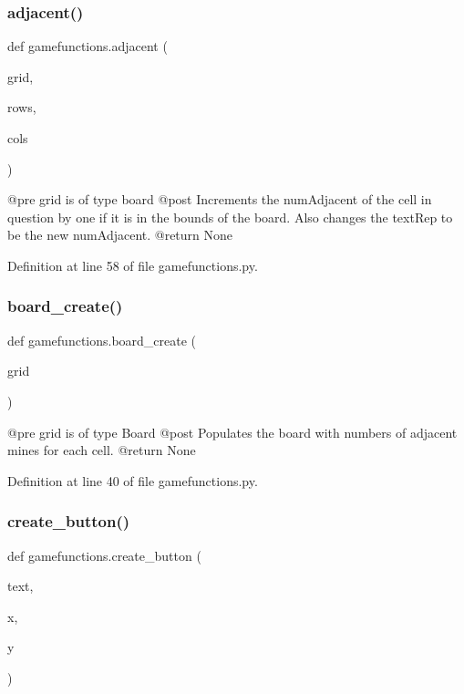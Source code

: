 \subsubsection{\texorpdfstring{adjacent()}{adjacent()}}
{\footnotesize\ttfamily def gamefunctions.\+adjacent (\begin{DoxyParamCaption}\item[{}]{grid,  }\item[{}]{rows,  }\item[{}]{cols }\end{DoxyParamCaption})}

\begin{DoxyVerb}@pre    grid is of type board
    @post   Increments the numAdjacent of the cell in question by one if it is in the bounds of the board. Also changes the textRep to be the new numAdjacent.
    @return None
\end{DoxyVerb}
 

Definition at line 58 of file gamefunctions.\+py.

\mbox{\label{namespacegamefunctions_a26a89961ef41d92fb61c4703f9c63dca}} 
\subsubsection{\texorpdfstring{board\+\_\+create()}{board\_create()}}
{\footnotesize\ttfamily def gamefunctions.\+board\+\_\+create (\begin{DoxyParamCaption}\item[{}]{grid }\end{DoxyParamCaption})}

\begin{DoxyVerb}@pre    grid is of type Board
    @post   Populates the board with numbers of adjacent mines for each cell.
    @return None
\end{DoxyVerb}
 

Definition at line 40 of file gamefunctions.\+py.

\mbox{\label{namespacegamefunctions_a60920b30a54df9dfed7de61f17403e07}} 
\subsubsection{\texorpdfstring{create\+\_\+button()}{create\_button()}}
{\footnotesize\ttfamily def gamefunctions.\+create\+\_\+button (\begin{DoxyParamCaption}\item[{}]{text,  }\item[{}]{x,  }\item[{}]{y }\end{DoxyParamCaption})}

